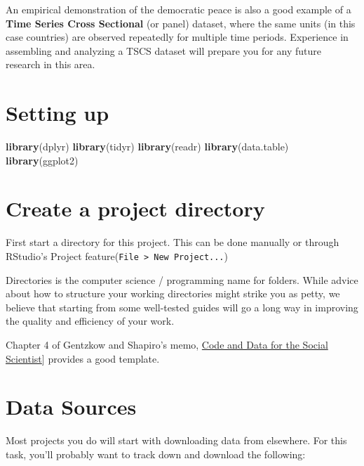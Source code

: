 \documentclass[]{book}
\newenvironment{Shaded}{\begin{snugshade}}{\end{snugshade}}
\newcommand{\KeywordTok}[1]{\textcolor[rgb]{0.13,0.29,0.53}{\textbf{#1}}}
\newcommand{\NormalTok}[1]{#1}
\theoremstyle{definition}
\theoremstyle{definition}
\theoremstyle{definition}
\theoremstyle{remark}
\begin{document}
An empirical demonstration of the democratic peace is also a good example of a \textbf{Time Series Cross Sectional} (or panel) dataset, where the same units (in this case countries) are observed repeatedly for multiple time periods. Experience in assembling and analyzing a TSCS dataset will prepare you for any future research in this area.

\hypertarget{setting-up}{%
\section{Setting up}\label{setting-up}}

\begin{Shaded}
\begin{Highlighting}[]
\KeywordTok{library}\NormalTok{(dplyr)}
\KeywordTok{library}\NormalTok{(tidyr)}
\KeywordTok{library}\NormalTok{(readr)}
\KeywordTok{library}\NormalTok{(data.table)}
\KeywordTok{library}\NormalTok{(ggplot2)}
\end{Highlighting}
\end{Shaded}

\hypertarget{create-a-project-directory}{%
\section{Create a project directory}\label{create-a-project-directory}}

First start a directory for this project. This can be done manually or through RStudio's Project feature(\texttt{File\ \textgreater{}\ New\ Project...})

Directories is the computer science / programming name for folders. While advice about how to structure your working directories might strike you as petty, we believe that starting from some well-tested guides will go a long way in improving the quality and efficiency of your work.

Chapter 4 of Gentzkow and Shapiro's memo, \href{https://web.stanford.edu/~gentzkow/research/CodeAndData.pdf}{Code and Data for the Social Scientist}{]} provides a good template.

\hypertarget{data-sources}{%
\section{Data Sources}\label{data-sources}}

Most projects you do will start with downloading data from elsewhere. For this task, you'll probably want to track down and download the following:
\end{document}
